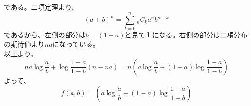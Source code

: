 \documentclass[a4j,uplatex,dvipdfmx]{jsarticle}
\begin{document}
である。二項定理より、
\begin{equation}
  (a+b)^n = \sum_{k=0}^n {}_nC_k a^n b^{n-k}
\end{equation}
であるから、左側の部分は$b=(1-a)$と見て１になる。右側の部分は二項分布の期待値より$na$になっている。\\
以上より、
\begin{equation}
    na\log{\frac{a}{b}} + \log{\frac{1-a}{1-b}}(n-na) = n \left( a\log{\frac{a}{b}} + (1-a)\log{\frac{1-a}{1-b}} \right)
\end{equation}
よって、
\begin{equation}
  f(a,b)= \left( a\log{\frac{a}{b}} + (1-a)\log{\frac{1-a}{1-b}} \right)
\end{equation}
\end{document}
